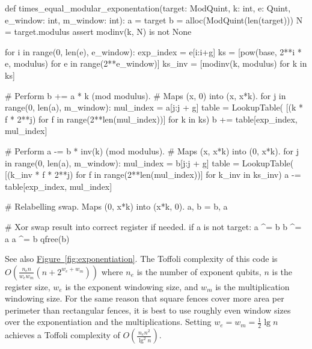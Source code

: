 \documentclass[onecolumn,unpublished]{quantumarticle}
\theoremstyle{definition}
\theoremstyle{definition}
\theoremstyle{definition}
\newcommand{\fig}[1]{\hyperref[fig:#1]{Figure~\ref*{fig:#1}}}
\begin{document}
\begin{python}
    def times_equal_modular_exponentation(target: ModQuint,
                                          k: int,
                                          e: Quint,
                                          e_window: int,
                                          m_window: int):
        a = target
        b = alloc(ModQuint(len(target)))
        N = target.modulus
        assert modinv(k, N) is not None

        for i in range(0, len(e), e_window):
            exp_index = e[i:i+g]
            ks = [pow(base, 2**i * e, modulus)
                  for e in range(2**e_window)]
            ks_inv = [modinv(k, modulus) for k in ks]
    
            # Perform b += a * k (mod modulus).
            # Maps (x, 0) into (x, x*k).
            for j in range(0, len(a), m_window):
                mul_index = a[j:j + g]
                table = LookupTable(
                    [(k * f * 2**j) %
                     for f in range(2**len(mul_index))]
                    for k in ks)
                b += table[exp_index, mul_index]
    
            # Perform a -= b * inv(k) (mod modulus).
            # Maps (x, x*k) into (0, x*k).
            for j in range(0, len(a), m_window):
                mul_index = b[j:j + g]
                table = LookupTable(
                    [(k_inv * f * 2**j) %
                     for f in range(2**len(mul_index))]
                    for k_inv in ks_inv)
                a -= table[exp_index, mul_index]
    
            # Relabelling swap. Maps (0, x*k) into (x*k, 0).
            a, b = b, a

        # Xor swap result into correct register if needed.
        if a is not target:
            a ^= b
            b ^= a
            a ^= b
        qfree(b)
\end{python}

See also \fig{exponentiation}.
The Toffoli complexity of this code is $O(\frac{n_e n}{w_e w_m} (n + 2^{w_e + w_m}))$ where $n_e$ is the number of exponent qubits, $n$ is the register size, $w_e$ is the exponent windowing size, and $w_m$ is the multiplication windowing size.
For the same reason that square fences cover more area per perimeter than rectangular fences, it is best to use roughly even window sizes over the exponentiation and the multiplications.
Setting $w_e=w_m=\frac{1}{2}\lg n$ achieves a Toffoli complexity of $O(\frac{n_e n^2}{\lg^2 n})$.
\end{document}
